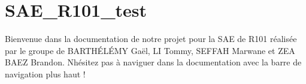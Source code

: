 \chapter{SAE\+\_\+\+R101\+\_\+test}
\hypertarget{index}{}\label{index}
Bienvenue dans la documentation de notre projet pour la SAE de R101 réalisée par le groupe de BARTHÉ\+LÉ\+MY Gaël, LI Tommy, SEFFAH Marwane et ZEA BAEZ Brandon. N\textquotesingle{}hésitez pas à naviguer dans la documentation avec la barre de navigation plus haut ! 